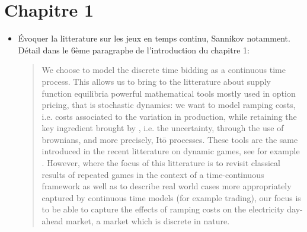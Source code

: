 \documentclass{article}
\begin{document}
\section{Chapitre 1}

\begin{itemize}

\item Évoquer la litterature sur les jeux en temps continu, Sannikov notamment.\\

Détail dans le 6ème paragraphe de l'introduction du chapitre 1:\\
\begin{quote}
We choose to model the discrete time bidding as a continuous time process.  This allows us to bring to the litterature about supply function equilibria powerful mathematical tools mostly used in option pricing, that is stochastic dynamics: we want to model ramping costs, i.e. costs associated to the variation in production, while retaining the key ingredient brought by \cite{KM}, i.e. the uncertainty, through the use of brownians, and more precisely, It\={o} processes. These tools are the same introduced in the recent litterature on dynamic games, see for example \cite{sannikov2016dynamic}. However, where the focus of this litterature is to revisit classical results of repeated games in the context of a time-continuous framework as well as to describe real world cases more appropriately captured by continuous time models (for example trading), our focus is to be able to capture the effects of ramping costs on the electricity day-ahead market, a market which is discrete in nature.
\end{quote}

\end{itemize}


\end{document}
